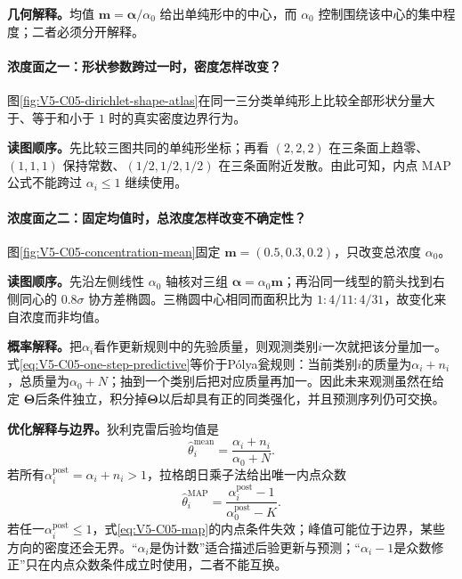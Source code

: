 
\label{struct:V5-C05-CH14}
\textbf{几何解释。}均值 $\boldsymbol m=\boldsymbol\alpha/\alpha_0$
给出单纯形中的中心，而 $\alpha_0$ 控制围绕该中心的集中程度；二者必须分开解释。

\paragraph{浓度面之一：形状参数跨过一时，密度怎样改变？}
图\ref{fig:V5-C05-dirichlet-shape-atlas}在同一三分类单纯形上比较全部形状分量大于、等于和小于 $1$ 时的真实密度边界行为。

\FloatBarrier
\noindent\textbf{读图顺序。}先比较三图共同的单纯形坐标；再看 $(2,2,2)$ 在三条面上趋零、$(1,1,1)$ 保持常数、$(1/2,1/2,1/2)$ 在三条面附近发散。由此可知，内点 MAP 公式不能跨过 $\alpha_i\le1$ 继续使用。\par

\paragraph{浓度面之二：固定均值时，总浓度怎样改变不确定性？}
图\ref{fig:V5-C05-concentration-mean}固定 $\boldsymbol m=(0.5,0.3,0.2)$，只改变总浓度 $\alpha_0$。

\FloatBarrier
\noindent\textbf{读图顺序。}先沿左侧线性 $\alpha_0$ 轴核对三组 $\boldsymbol\alpha=\alpha_0\boldsymbol m$；再沿同一线型的箭头找到右侧同心的 $0.8\sigma$ 协方差椭圆。三椭圆中心相同而面积比为 $1:4/11:4/31$，故变化来自浓度而非均值。\par

\label{struct:V5-C05-CH15}
\textbf{概率解释。}把$\alpha_i$看作更新规则中的先验质量，则观测类别$i$一次就把该分量加一。式\eqref{eq:V5-C05-one-step-predictive}等价于Pólya瓮规则：当前类别$i$的质量为$\alpha_i+n_i$，总质量为$\alpha_0+N$；抽到一个类别后把对应质量再加一。因此未来观测虽然在给定
$\boldsymbol\Theta$后条件独立，积分掉$\boldsymbol\Theta$以后却具有正的同类强化，并且预测序列仍可交换。

\label{struct:V5-C05-CH16}
\textbf{优化解释与边界。}狄利克雷后验均值是
\[
\widehat\theta_i^{\mathrm{mean}}
=\frac{\alpha_i+n_i}{\alpha_0+N}.
\]
若所有$\alpha_i^{\mathrm{post}}=\alpha_i+n_i>1$，拉格朗日乘子法给出唯一内点众数
\begin{equation}\label{eq:V5-C05-map}
\widehat\theta_i^{\mathrm{MAP}}
=\frac{\alpha_i^{\mathrm{post}}-1}{\alpha_0^{\mathrm{post}}-K}.
\end{equation}
若任一$\alpha_i^{\mathrm{post}}\le1$，式\eqref{eq:V5-C05-map}的内点条件失效；峰值可能位于边界，某些方向的密度还会无界。“$\alpha_i$是伪计数”适合描述后验更新与预测；“$\alpha_i-1$是众数修正”只在内点众数条件成立时使用，二者不能互换。

